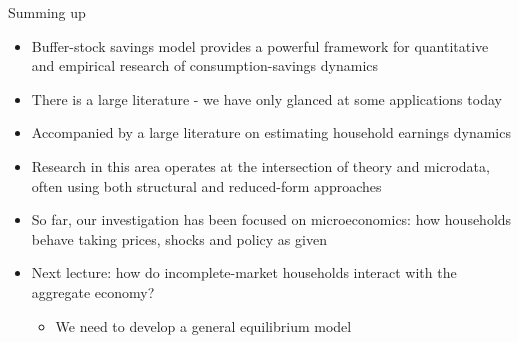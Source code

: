 \documentclass[9pt]{beamer}
\newcommand{\bit}{\begin{itemize}}
\newcommand{\eit}{\end{itemize}}
\begin{document}
\begin{frame}{Summing up}

\bit
\setlength\itemsep{1em}
\item Buffer-stock savings model provides a powerful framework for quantitative and empirical research of consumption-savings dynamics

\item There is a large literature - we have only glanced at some applications today

\item Accompanied by a large literature on estimating household earnings dynamics

\item Research in this area operates at the intersection of theory and microdata, often using both structural and reduced-form approaches

%
%	



\item So far, our investigation has been focused on microeconomics: how households behave taking prices, shocks and policy as given

\item Next lecture: how do incomplete-market households interact with the aggregate economy?
\bit
	\item We need to develop a general equilibrium model
\eit

\eit


\end{frame}
\end{document}
